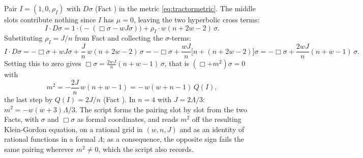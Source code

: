 Pair $I = (1, 0, \rho_{I})$ with $D\sigma$ (Fact ) in the metric \eqref{eq:tractormetric}. The middle slots contribute nothing since $I$ has $\mu = 0$, leaving the two hyperbolic cross terms:
\[
I \cdot D\sigma = 1 \cdot \bigl(-(\Box\sigma - wJ\sigma)\bigr) + \rho_{I} \cdot w(n+2w-2)\,\sigma .
\]
Substituting $\rho_{I} = J/n$ from Fact  and collecting the $\sigma$-terms:
\[
I \cdot D\sigma = -\Box\sigma + wJ\sigma + \frac{J}{n}\,w(n+2w-2)\,\sigma
= -\Box\sigma + \frac{wJ}{n}\bigl[n + (n+2w-2)\bigr]\sigma
= -\Box\sigma + \frac{2wJ}{n}(n+w-1)\,\sigma .
\]
Setting this to zero gives $\Box\sigma = \tfrac{2wJ}{n}(n+w-1)\,\sigma$, that is $(\Box + m^{2})\sigma = 0$ with
\[
m^{2} = -\frac{2J}{n}\,w(n+w-1) = -\,w(w+n-1)\,Q(I),
\]
the last step by $Q(I) = 2J/n$ (Fact ). In $n = 4$ with $J = 2\Lambda/3$: $m^{2} = -w(w+3)\Lambda/3$. The script forms the pairing slot by slot from the two Facts, with $\sigma$ and $\Box\sigma$ as formal coordinates, and reads $m^{2}$ off the resulting Klein-Gordon equation, on a rational grid in $(w, n, J)$ and as an identity of rational functions in a formal $\Lambda$; as a consequence, the opposite sign fails the same pairing wherever $m^{2} \neq 0$, which the script also records.
